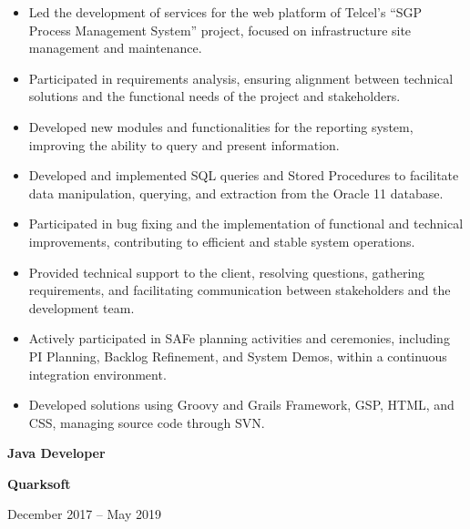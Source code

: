 \documentclass[10pt,letterpaper]{article}
\newcommand{\jobtitle}[1]{
    {\bfseries #1}
}
\newcommand{\company}[1]{
    {\bfseries\color{DarkGray} #1}
}
\newcommand{\jobdate}[1]{
    {\color{MediumGray} #1}
}
\begin{document}
\begin{itemize}

    \item Led the development of services for the web platform of Telcel's ``SGP Process Management System'' project, focused on infrastructure site management and maintenance.

    \item Participated in requirements analysis, ensuring alignment between technical solutions and the functional needs of the project and stakeholders.

    \item Developed new modules and functionalities for the reporting system, improving the ability to query and present information.

    \item Developed and implemented SQL queries and Stored Procedures to facilitate data manipulation, querying, and extraction from the Oracle 11 database.

    \item Participated in bug fixing and the implementation of functional and technical improvements, contributing to efficient and stable system operations.

    \item Provided technical support to the client, resolving questions, gathering requirements, and facilitating communication between stakeholders and the development team.

    \item Actively participated in SAFe planning activities and ceremonies, including PI Planning, Backlog Refinement, and System Demos, within a continuous integration environment.

    \item Developed solutions using Groovy and Grails Framework, GSP, HTML, and CSS, managing source code through SVN.

\end{itemize}


\jobtitle{Java Developer} \textbar{}
\company{Quarksoft}
\hfill \textbar{}
\jobdate{December 2017 -- May 2019}
\end{document}
